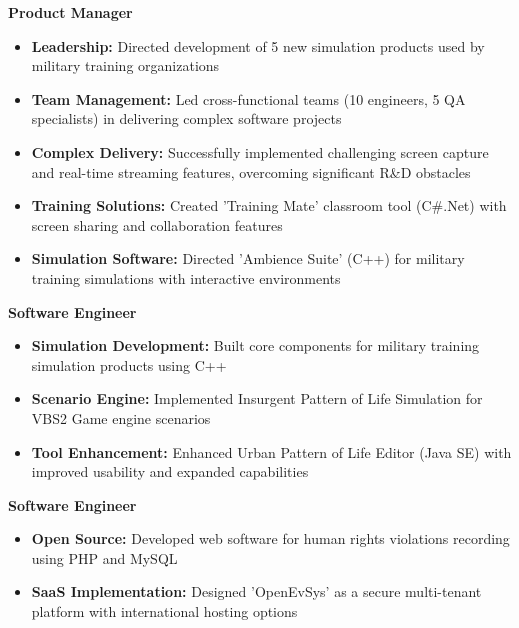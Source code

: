 \documentclass{fullstackdeveloper-ats}
\begin{document}
\vspace{0.3cm}

\noindent\textbf{Product Manager} \hfill {}\\

\begin{itemize}
    \item \textbf{Leadership:} Directed development of 5 new simulation products used by military training organizations
    \item \textbf{Team Management:} Led cross-functional teams (10 engineers, 5 QA specialists) in delivering complex software projects
    \item \textbf{Complex Delivery:} Successfully implemented challenging screen capture and real-time streaming features, overcoming significant R\&D obstacles
    \item \textbf{Training Solutions:} Created 'Training Mate' classroom tool (C\#.Net) with screen sharing and collaboration features
    \item \textbf{Simulation Software:} Directed 'Ambience Suite' (C++) for military training simulations with interactive environments
\end{itemize}

\vspace{0.3cm}

\noindent\textbf{Software Engineer} \hfill {}\\

\begin{itemize}
    \item \textbf{Simulation Development:} Built core components for military training simulation products using C++
    \item \textbf{Scenario Engine:} Implemented Insurgent Pattern of Life Simulation for VBS2 Game engine scenarios
    \item \textbf{Tool Enhancement:} Enhanced Urban Pattern of Life Editor (Java SE) with improved usability and expanded capabilities
\end{itemize}

\vspace{0.3cm}

\noindent\textbf{Software Engineer} \hfill {}\\

\begin{itemize}
    \item \textbf{Open Source:} Developed web software for human rights violations recording using PHP and MySQL
    \item \textbf{SaaS Implementation:} Designed 'OpenEvSys' as a secure multi-tenant platform with international hosting options
\end{itemize}
\end{document}
